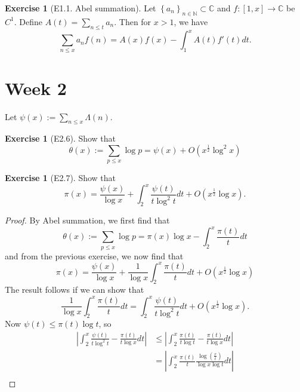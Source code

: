 \documentclass[reqno]{amsart}
\theoremstyle{definition}
\newtheorem{exercise}[theorem]{Exercise}
\theoremstyle{remark}
\begin{document}
\begin{exercise}[E1.1. Abel summation]
    Let $\left\{ a_n \right\}_{n \in \mathbb{N} }\subset \mathbb{C}$ 
    and $f \colon \left[ 1,x \right] \to \mathbb{C}$ be
    $C^{1}$. Define $A(t) = \sum_{n \le t} a_n$. Then for
    $x>1$, we have
    \[
    \sum_{n\le x} a_n f(n) = A(x) f(x) -
    \int_{1}^{x} A(t) f'(t) dt. 
    \] 
\end{exercise}



\section{Week 2}

Let $\psi (x) :=
\sum_{n \le x} \Lambda (n)$.

\begin{exercise}[E2.6]
    Show that
    \[
    \theta(x) := 
    \sum_{p \le x} \log p = \psi (x) + O\left( x^{\frac{1}{2}}
    \log^2 x \right) 
    \] 
\end{exercise}

\begin{exercise}[E2.7]
    Show that
    \[
    \pi(x) = \frac{\psi (x)}{\log x}+ 
    \int_{2}^{x} \frac{\psi (t)}{t \log^2t}dt +
    O\left( x^{\frac{1}{2}} \log x \right) .
    \] 
\end{exercise}

\begin{proof}
    By Abel summation, we first find that
    \[
    \theta(x) :=
    \sum_{p \le x} \log p = 
    \pi(x) \log x - \int_{2}^{x} \frac{\pi(t)}{t}dt
    \] 
    and from the previous exercise, we now find
    that
    \[
    \pi(x) = \frac{\psi (x)}{\log x} +
    \frac{1}{\log x} \int_{2}^{x}\frac{\pi(t)}{t}dt 
    + O \left( x^{\frac{1}{2}} \log x \right) 
    \] 
    The result follows if we
    can show that
    \[
    \frac{1}{\log x} \int_{2}^{x} \frac{\pi(t)}{t}dt
    = \int_{2}^{x} \frac{\psi (t)}{t \log^2 t}dt 
    + O\left( x^{\frac{1}{2}} \log x \right).
    \] 
    Now $\psi (t) \le \pi(t) \log t$, so
    \begin{align*}
        \left| \int_{2}^{x} 
        \frac{\psi (t)}{t \log^2 t} - 
        \frac{\pi(t)}{t \log x}dt \right| 
        &\le 
        \left| \int_{2}^{x} \frac{\pi(t)}{t \log t} -
        \frac{\pi(t)}{t \log x} dt\right| \\
        &= \left| 
        \int_{2}^{x} \frac{\pi(t)}{t} 
        \frac{\log \left( \frac{x}{t} \right) }{\log x 
        \log t} dt\right| \\
    \end{align*}
\end{proof}
\end{document}
